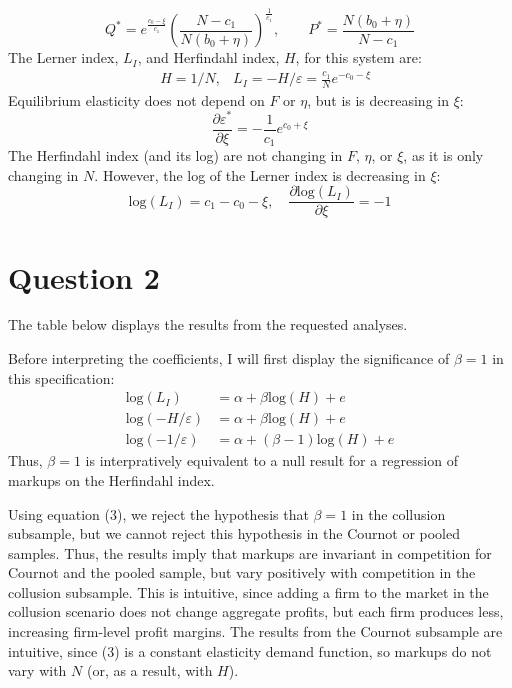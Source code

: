 \documentclass{article}
\newcommand{\loge}[1]{\text{log}\left(#1\right)}
\newcommand{\pl}{\partial}
\begin{document}
\begin{itemize}
\[      Q^* = e^{\frac{c_0-\xi}{c_1}}\left(\frac{N-c_1}{N(b_0+\eta)}\right)^\frac{1}{c_1}, \quad\quad 
      P^* = \frac{N(b_0+\eta)}{N-c_1}
    \]
    The Lerner index, $L_I$, and Herfindahl index, $H$, for this system are:\begin{align*}
      &H = 1/N, &L_I = -H/\varepsilon = \frac{c_1}{N}e^{-c_0-\xi}
    \end{align*}
    Equilibrium elasticity does not depend on $F$ or $\eta$, but is is decreasing in $\xi$:\[
      \frac{\pl\varepsilon^*}{\pl\xi} = -\frac{1}{c_1}e^{c_0 + \xi}
    \]
    The Herfindahl index (and its log) are not changing in $F$, $\eta$, or $\xi$, as it is only changing in $N$. However, the log of the Lerner index is decreasing in $\xi$:\[
      \loge{L_I} = c_1 - c_0 - \xi,\quad \frac{\pl\loge{L_I}}{\pl\xi} = -1
    \]
\end{itemize}
\pagebreak 
\section*{Question 2}
The table below displays the results from the requested analyses.
\begin{center}
  
\end{center}
Before interpreting the coefficients, I will first display the significance of ${\beta=1}$ in this specification:\begin{align*} 
  \loge{L_I} &= \alpha + \beta\loge{H} + e \\
  \loge{-H/\varepsilon} &= \alpha + \beta\loge{H} + e \\
  \loge{-1/\varepsilon} &= \alpha + (\beta-1)\loge{H} + e 
\end{align*}
Thus, ${\beta=1}$ is interpratively equivalent to a null result for a regression of markups on the Herfindahl index.

Using equation (3), we reject the hypothesis that ${\beta=1}$ in the collusion subsample, but we cannot reject this hypothesis in the Cournot or pooled samples. Thus, the results imply that markups are invariant in competition for Cournot and the pooled sample, but vary positively with competition in the collusion subsample. This is intuitive, since adding a firm to the market in the collusion scenario does not change aggregate profits, but each firm produces less, increasing firm-level profit margins. The results from the Cournot subsample are intuitive, since (3) is a constant elasticity demand function, so markups do not vary with $N$ (or, as a result, with $H$).
\end{document}
